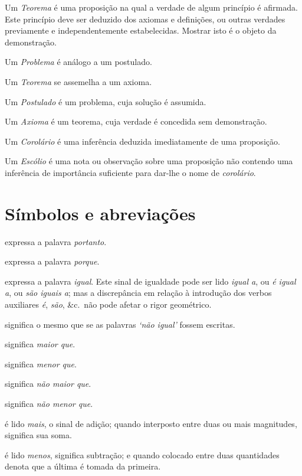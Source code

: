 \documentclass[booklanguage=brazilian]{byrnebook}
\begin{document}
Um \emph{Teorema} é uma proposição na qual a verdade de algum princípio é afirmada. Este princípio deve ser deduzido dos axiomas e definições, ou outras verdades previamente e independentemente estabelecidas. Mostrar isto é o objeto da demonstração.

Um \emph{Problema} é análogo a um postulado.

Um \emph{Teorema} se assemelha a um axioma.

Um \emph{Postulado} é um problema, cuja solução é assumida.

Um \emph{Axioma} é um teorema, cuja verdade é concedida sem demonstração.

Um \emph{Corolário} é uma inferência deduzida imediatamente de uma proposição.

Um \emph{Escólio} é uma nota ou observação sobre uma proposição não contendo uma inferência de importância suficiente para dar-lhe o nome de \emph{corolário}.


\chapter*{Símbolos e abreviações}

\symb{$\therefore$}
expressa a palavra \emph{portanto}.

\symb{$\because$}
 expressa a palavra \emph{porque}.

\symb{$=$}
 expressa a palavra \emph{igual}. Este sinal de igualdade pode ser lido \emph{igual a}, ou \emph{é igual a}, ou \emph{são iguais a}; mas a discrepância em relação à introdução dos verbos auxiliares \emph{é}, \emph{são}, \&c.\ não pode afetar o rigor geométrico.

\symb{$\neq$}
 significa o mesmo que se as palavras \emph{‘não igual’} fossem escritas.

\symb{$>$}
 significa \emph{maior que}.

\symb{$<$}
 significa \emph{menor que}.

\symb{$\ngtr$}
 significa \emph{não maior que}.

\symb{$\nless$}
 significa \emph{não menor que}.

\symb{$+$}
 é lido \emph{mais}, o sinal de adição; quando interposto entre duas ou mais magnitudes, significa sua soma.

\symb{$-$}
 é lido \emph{menos}, significa subtração; e quando colocado entre duas quantidades denota que a última é tomada da primeira.
\end{document}
